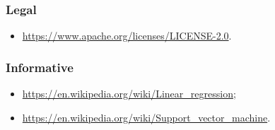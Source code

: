 \subsubsection{Legal}
\begin{itemize}
	\item \url{https://www.apache.org/licenses/LICENSE-2.0}.
\end{itemize}

\subsubsection{Informative}
\begin{itemize}
	\item \url{https://en.wikipedia.org/wiki/Linear_regression};
	\item \url{https://en.wikipedia.org/wiki/Support_vector_machine}.
\end{itemize}
	

